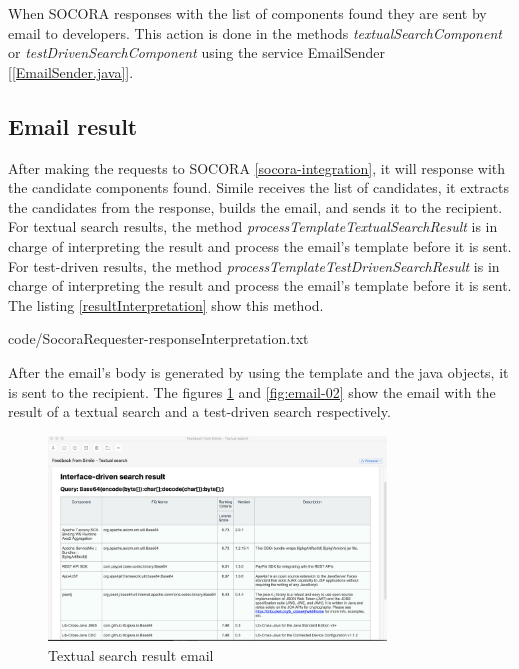 When SOCORA responses with the list of components found they are sent by email to developers. This action is done in the methods \emph{textualSearchComponent} or \emph{testDrivenSearchComponent} using the service EmailSender [\ref{EmailSender.java}].

\subsection{Email result}
After making the requests to SOCORA \ref{socora-integration}, it will response with the candidate components found. Simile receives the list of candidates, it extracts the candidates from the response, builds the email, and sends it to the recipient. For textual search results, the method \emph{processTemplateTextualSearchResult} is in charge of interpreting the result and process the email's template before it is sent. For test-driven results, the method \emph{processTemplateTestDrivenSearchResult} is in charge of interpreting the result and process the email's template before it is sent. The listing \ref{resultInterpretation} show this method.


{code/SocoraRequester-responseInterpretation.txt}

After the email's body is generated by using the template and the java objects, it is sent to the recipient. The figures \ref{fig:email-01} and \ref{fig:email-02} show the email with the result of a textual search and a test-driven search respectively.

\begin{figure}[H]
	\centering
    \includegraphics[width=0.8\textwidth]{grafiken/email-01}
    \caption{Textual search result email}
    \label{fig:email-01}
\end{figure}

